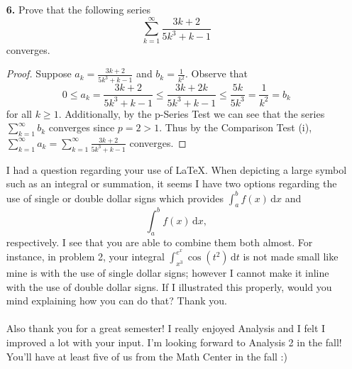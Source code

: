 \documentclass[ 12pt ]{article}
\begin{document}
\begin{enumerate}
	\item[\textbf{6.}] Prove that the following series $$\sum_{k=1}^\infty \frac{3k + 2}{5k^3 + k - 1}$$ converges.

	\begin{proof}
		Suppose $a_k = \frac{3k + 2}{5k^3 + k - 1}$ and $b_k = \frac{1}{k^2}$. Observe that $$0 \leq a_k = \frac{3k + 2}{5k^3 + k - 1} \leq \frac{3k + 2k}{5k^3 + k - 1}
		\leq \frac{5k}{5k^3} = \frac{1}{k^2} = b_k$$ for all $k \geq 1$. Additionally, by the p-Series Test we can see that the series $\sum_{k = 1}^\infty b_k$ converges since
		$p = 2 > 1$. Thus by the Comparison Test (i), $\sum_{k=1}^\infty a_k = \sum_{k=1}^\infty \frac{3k + 2}{5k^3 + k - 1}$ converges.
	\end{proof}
	\newpage


	I had a question regarding your use of LaTeX. When depicting a large symbol such as an integral or summation, it seems I have two options regarding the use of single or
		double dollar signs which provides $\int_a^b f(x)\,\mathrm{d}x$ and $$\int_a^b f(x)\,\mathrm{d}x,$$ respectively. I see that you are able to combine them both almost. For instance, in
		problem 2, your integral $\int_{x^3}^{e^x} \cos(t^2)\,\mathrm{d}t$ is not made small like mine is with the use of single dollar signs; however I cannot make it inline with the
		use of double dollar signs. If I illustrated this properly, would you mind explaining how you can do that? Thank you. \\ \\
	Also thank you for a great semester! I really enjoyed Analysis and I felt I improved a lot with your input. I'm looking forward to Analysis 2 in the fall! You'll have at least five of us from the Math Center in the fall :)

\end{enumerate}
\end{document}
